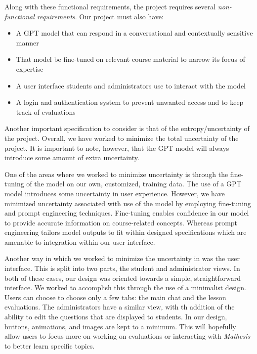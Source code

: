 \documentclass[12pt,a4paper]{article}
\begin{document}
    Along with these functional requirements, the project requires several \textit{non-functional
    requirements}.  Our project must also have:

    \begin{itemize}
        \label{nonFunctionalReqs}
        \item A GPT model that can respond in a conversational and contextually sensitive manner
        \item That model be fine-tuned on relevant course material to narrow its focus of expertise
        \item A user interface students and administrators use to interact with the model
        \item A login and authentication system to prevent unwanted access and to keep track of evaluations
    \end{itemize}

    Another important specification to consider is that of the entropy/uncertainty of the project.
    Overall, we have worked to minimize the total uncertainty of the project.  It is important to note,
    however, that the GPT model will always introduce some amount of extra uncertainty.

    One of the areas where we worked to minimize uncertainty is through the fine-tuning of the model on our
    own, customized, training data.  The use of a GPT model introduces some uncertainty in user
    experience. However, we have minimized uncertainty associated with use of the model by employing
    fine-tuning and prompt engineering techniques. Fine-tuning enables confidence in our model to
    provide accurate information on course-related concepts. Whereas prompt engineering tailors
    model outputs to fit within designed specifications which are amenable to integration within
    our user interface.

    Another way in which we worked to minimize the uncertainty in was the user interface.  This is
    split into two parts, the student and administrator views.  In both of these cases, our design
    was oriented towards a simple, straightforward interface.  We worked to accomplish this through
    the use of a minimalist design.  Users can choose to choose only a few tabs: the main chat and
    the lesson evaluations.  The administrators have a similar view, with th addition of the ability
    to edit the questions that are displayed to students.  In our design, buttons, animations, and
    images are kept to a minimum.  This will hopefully allow users to focus more on working on
    evaluations or interacting with \textit{Mathesis} to better learn specific topics.
\end{document}

